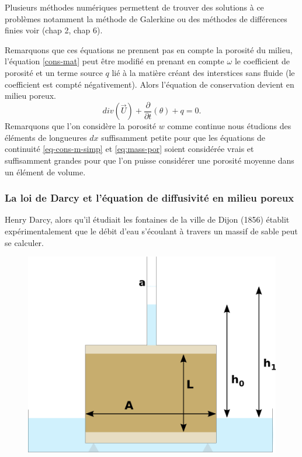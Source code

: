 \documentclass[a4paper,11pt]{article}
\numberwithin{equation}{section}
\begin{document}
Plusieurs méthodes numériques permettent de trouver des solutions à ce problèmes notamment la méthode de Galerkine ou des méthodes de différences finies voir \cite{allaire2005analyse} (chap 2, chap 6). 

\vspace{7mm}

Remarquons que ces équations ne prennent pas en compte la porosité du milieu, l'équation \eqref{cons-mat} peut être modifié en prenant en compte $\omega$ le coefficient de porosité et un terme source $q$ lié à la matière créant des interstices sans fluide (le coefficient est compté négativement). Alors l'équation de conservation devient en milieu poreux.
\begin{equation}
	\label{eq:mass-por}
	div(\overrightarrow{U})+\frac{\partial}{\partial t}(\theta)+ q=0.
\end{equation}
Remarquons que l'on considère la porosité $w$ comme continue nous étudions des éléments de longueures $dx$ suffisamment petite pour que les équations de continuité \eqref{eq-cons-m-simp} et \eqref{eq:mass-por} soient considérée vrais et suffisamment grandes pour que l'on puisse considérer une porosité moyenne dans un élément de volume.

\subsubsection{La loi de Darcy et l'équation de diffusivité en milieu poreux}
\label{Darcy}
Henry Darcy, alors qu'il étudiait les fontaines de la ville de Dijon (1856) établit expérimentalement que le débit d'eau s'écoulant à travers un massif de sable peut se calculer.

\begin{figure}[!h]
	\begin{center}
		\includegraphics[scale=0.4]{darcy.png}
	\end{center}
	\label{fig:Darcy}
\end{figure}
\end{document}
